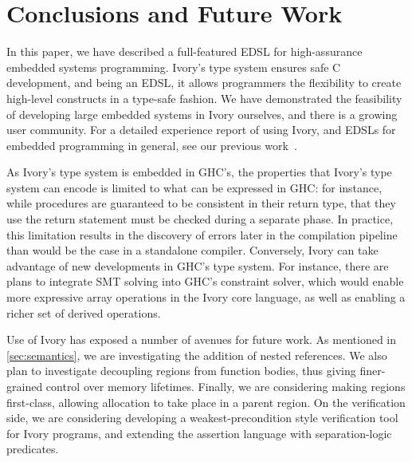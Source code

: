\section{Conclusions and Future Work}
\label{sec:conclusion}

In this paper, we have described a full-featured EDSL for high-assurance
embedded systems programming. Ivory's type system ensures safe C development,
and being an EDSL, it allows programmers the flexibility to create high-level
constructs in a type-safe fashion. %
We have demonstrated the feasibility of developing large embedded systems in
Ivory ourselves, and there is a growing user community. For a detailed
experience report of using Ivory, and EDSLs for embedded programming in general,
see our previous work~\cite{smaccm}.

As Ivory's type system is embedded in GHC's, the properties that Ivory's type
system can encode is limited to what can be expressed in GHC: for instance,
while procedures are guaranteed to be consistent in their return type, that they
use the return statement must be checked during a separate phase.  In practice,
this limitation results in the discovery of errors later in the compilation
pipeline than would be the case in a standalone compiler.  Conversely, Ivory can
take advantage of new developments in GHC's type system.  For instance, there
are plans to integrate SMT solving into GHC's constraint solver, which would
enable more expressive array operations in the Ivory core language, as well as
enabling a richer set of derived operations.

Use of Ivory has exposed a number of avenues for future work. As mentioned in
\autoref{sec:semantics}, we are investigating the addition of nested references.
We also plan to investigate decoupling regions from function bodies, thus giving
finer-grained control over memory lifetimes.  Finally, we are considering making
regions first-class, allowing allocation to take place in a parent region.  On
the verification side, we are considering developing a weakest-precondition
style verification tool for Ivory programs, and extending the assertion language
with separation-logic predicates.
